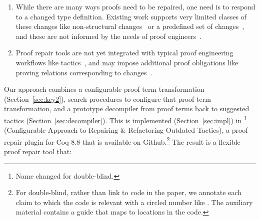 \begin{enumerate}
\item While there are many ways proofs need to be repaired, one need is to respond to a changed type definition.
Existing work supports very limited classes of these changes like non-structural changes~\cite{pumpkinpatch} or a predefined set
of changes~\cite{robert2018, wibergh2019}, and these are not informed by the needs of proof engineers~\cite{replica}.
\item Proof repair tools are not yet integrated with typical proof engineering workflows like tactics~\cite{PGL-045, pumpkinpatch, robert2018},
and may impose additional proof obligations like proving relations corresponding to changes~\cite{Ringer2019}.
\end{enumerate}
%

Our approach combines a configurable proof term transformation (Section~\ref{sec:key2}),
search procedures to configure that proof term transformation, and a prototype decompiler from proof terms
back to suggested tactics (Section~\ref{sec:decompiler}).
This is implemented (Section~\ref{sec:impl}) in \toolname\footnote{Name changed for double-blind.} (Configurable Approach to Repairing \& Refactoring Outdated Tactics), a proof repair plugin for Coq 8.8 that is available on Github.\footnote{For double-blind, rather than link to code in the paper, we annotate each claim to which the code is relevant with a circled number like . The auxiliary material contains a guide that maps to locations in the code.}
The result is a flexible proof repair tool that: 

